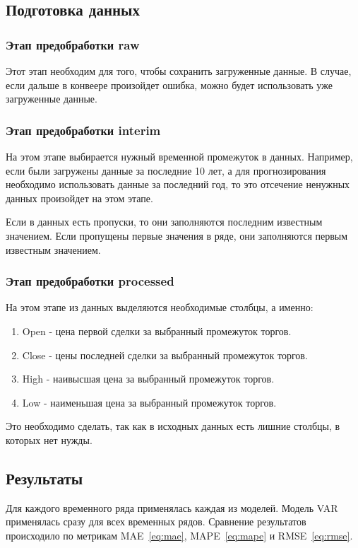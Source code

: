 \documentclass[a4paper,article,14pt]{extarticle}
\begin{document}
\subsection{Подготовка данных}

\subsubsection{Этап предобработки raw}
Этот этап необходим для того, чтобы сохранить загруженные данные.
В случае, если дальше в конвеере произойдет ошибка, можно будет использовать уже загруженные данные.

\subsubsection{Этап предобработки interim}
На этом этапе выбирается нужный временной промежуток в данных.
Например, если были загружены данные за последние 10 лет, а для прогнозирования необходимо использовать данные за последний год, то это отсечение ненужных данных произойдет на этом этапе.
\par

Если в данных есть пропуски, то они заполняются последним известным значением.
Если пропущены первые значения в ряде, они заполняются первым известным значением.

\subsubsection{Этап предобработки processed}

На этом этапе из данных выделяются необходимые столбцы, а именно:
\begin{enumerate}
    \item Open - цена первой сделки за выбранный промежуток торгов.
    \item Close - цены последней сделки за выбранный промежуток торгов.
    \item High - наивысшая цена за выбранный промежуток торгов.
    \item Low - наименьшая цена за выбранный промежуток торгов.
\end{enumerate}
\par

Это необходимо сделать, так как в исходных данных есть лишние столбцы, в которых нет нужды.

\subsection{Результаты}
Для каждого временного ряда применялась каждая из моделей.
Модель VAR применялась сразу для всех временных рядов.
Сравнение результатов происходило по метрикам MAE~\eqref{eq:mae}, MAPE~\eqref{eq:mape} и RMSE~\eqref{eq:rmse}.
\end{document}
